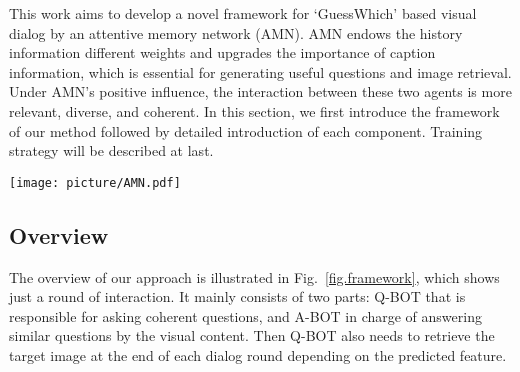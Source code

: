 \documentclass[review]{elsarticle}
\begin{document}
	This work aims to develop a novel framework for `GuessWhich' based visual dialog by an attentive memory network (AMN). AMN endows the history information different weights and upgrades the importance of caption information, which is essential for generating useful questions and image retrieval. 
	Under AMN's positive influence, the interaction between these two agents is more relevant, diverse, and coherent.
	In this section, we first introduce the framework of our method followed by detailed introduction of each component. Training strategy will be described at last. 
\begin{figure*}[ht]
	\centering
	\centering
	\texttt{[image: picture/AMN.pdf]}
	\centering 
	\caption{General framework of the proposed method. It illustrates the architecture of the two agents and the interaction between them at round t. Firstly, a question $\mathbf{q_{t}}$ is generated from question decoder based on the state encoding $\mathbf{s^{Q}_{t-1}}$. Secondly, A-BOT receives the question and encodes it. The encoded question queries the memory $\mathbf{M^{A}_{t-1}}$, and then the fusion model in the AMN$^A$ outputs the contacted information ($\mathbf{f^{Q}_{t}}$, $\textbf{C}$, $\mathbf{h^{Q}_{t-1}}$) which is used to decode an answer $\mathbf{a_{t}}$. Thirdly, A-BOT delivers the answer $\mathbf{a_{t}}$ to Q-BOT. And the question-answer pair is embedded as a fact $\mathbf{f_{t}}$ which queries the memory $\mathbf{M^{Q}_{t-1}}$. Then the fusion model in AMN$^Q$ outputs the contacted information ($\mathbf{q_{t}}$, $\textbf{I}$, $\mathbf{h^{A}_{t-1}}$) which is used to update the state $\mathbf{s^{Q}_{t}}$. Finally, Q-BOT predicts an image representation $\mathbf{\hat{y}_{t}}$ depending on the state $\mathbf{s^{Q}_{t}}$, and receives a reward.} 
	\label{fig.framework}
\end{figure*}	

\subsection{Overview}
	The overview of our approach is illustrated in Fig.~\ref{fig.framework}, which shows just a round of interaction.
	It mainly consists of two parts: Q-BOT that is responsible for asking coherent questions, and A-BOT in charge of answering similar questions by the visual content. 
	Then Q-BOT also needs to retrieve the target image at the end of each dialog round depending on the predicted feature.
	
\end{document}
